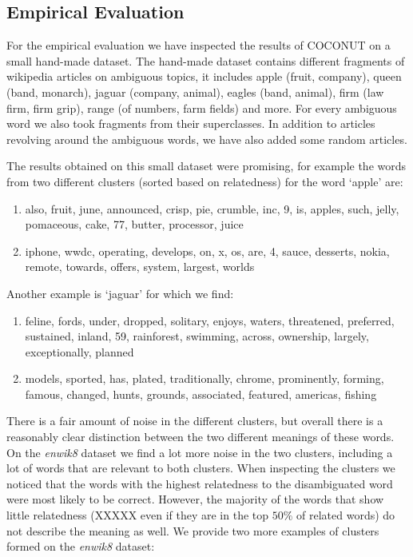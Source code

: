 \documentclass[11pt]{article}
\begin{document}
\subsection{Empirical Evaluation}
For the empirical evaluation we have inspected the results of COCONUT on a small hand-made dataset. The hand-made dataset contains different fragments of wikipedia articles on ambiguous topics, it includes apple (fruit, company), queen (band, monarch), jaguar (company, animal), eagles (band, animal), firm (law firm, firm grip), range (of numbers, farm fields) and more. For every ambiguous word we also took fragments from their superclasses. In addition to articles revolving around the ambiguous words, we have also added some random articles.

The results obtained on this small dataset were promising, for example the words from two different clusters  (sorted based on relatedness) for the word `apple' are: 
\begin{enumerate}
\item also, fruit, june, announced, crisp, pie, crumble, inc, 9, is, apples, such, jelly, pomaceous, cake, 77, butter, processor, juice
\item iphone, wwdc, operating, develops, on, x, os, are, 4, sauce, desserts, nokia, remote, towards, offers, system, largest, worlds
\end{enumerate}
Another example is `jaguar' for which we find: 
\begin{enumerate}
\item feline, fords, under, dropped, solitary, enjoys, waters, threatened, preferred, sustained, inland, 59, rainforest, swimming, across, ownership, largely, exceptionally, planned
\item models, sported, has, plated, traditionally, chrome, prominently, forming, famous, changed, hunts, grounds, associated, featured, americas, fishing
\end{enumerate}
There is a fair amount of noise in the different clusters, but overall there is a reasonably clear distinction between the two different meanings of these words.
On the \textit{enwik8} dataset we find a lot more noise in the two clusters, including a lot of words that are relevant to both clusters. When inspecting the clusters we noticed that the words with the highest relatedness to the disambiguated word were most likely to be correct. However, the majority of the words that show little relatedness (XXXXX even if they are in the top $50\%$ of related words) do not describe the meaning as well. We provide two more examples of clusters formed on the \textit{enwik8} dataset:\\\\
\end{document}
